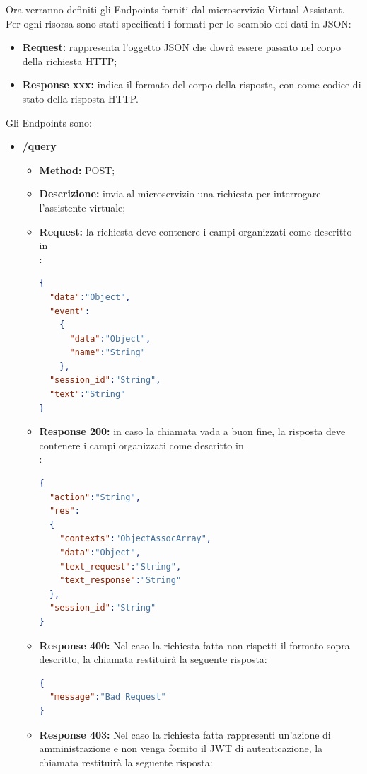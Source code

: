 Ora verranno definiti gli Endpoints forniti dal microservizio Virtual Assistant.\\
Per ogni risorsa sono stati specificati i formati per lo scambio dei dati in JSON:
\begin{itemize}
\item \textbf{Request:} rappresenta l’oggetto JSON che dovrà essere passato nel corpo della richiesta HTTP;
\item \textbf{Response xxx:} indica il formato del corpo della risposta, con  come codice di stato della risposta HTTP.
\end{itemize}
Gli Endpoints sono:
\begin{itemize}
\item \textbf{/query}\\
\begin{itemize}
\item \textbf{Method:} POST;
\item \textbf{Descrizione:} invia al microservizio una richiesta per interrogare l'assistente virtuale;
\item \textbf{Request:} la richiesta deve contenere i campi organizzati come descritto in \\:
\begin{lstlisting}[language=json,firstnumber=1]
{
  "data":"Object",
  "event":
    {
      "data":"Object",
      "name":"String"
    },
  "session_id":"String",
  "text":"String"
}
\end{lstlisting}
\newpage
\item \textbf{Response 200:} in caso la chiamata vada a buon fine, la risposta deve contenere i campi organizzati come descritto in \\:
\begin{lstlisting}[language=json,firstnumber=1]
{
  "action":"String",
  "res":
  {
    "contexts":"ObjectAssocArray",
    "data":"Object",
    "text_request":"String",
    "text_response":"String"
  },
  "session_id":"String"
}
\end{lstlisting}
\item \textbf{Response 400:} Nel caso la richiesta fatta non rispetti il formato sopra descritto, la chiamata restituirà la seguente risposta:
\begin{lstlisting}[language=json,firstnumber=1]
{
  "message":"Bad Request"
}
\end{lstlisting}
\item \textbf{Response 403:} Nel caso la richiesta fatta rappresenti un'azione di amministrazione e non venga fornito il JWT di autenticazione, la chiamata restituirà la seguente risposta:

\end{itemize}
\end{itemize}
